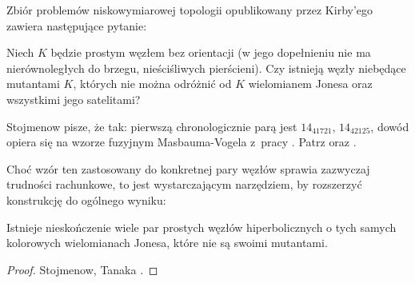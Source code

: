 Zbiór problemów niskowymiarowej topologii opublikowany przez Kirby'ego \cite{kirby1978} zawiera następujące pytanie:
%

\begin{conjecture}[problem 1.91]
    Niech $K$ będzie prostym węzłem bez orientacji (w jego dopełnieniu nie ma nierównoległych do brzegu, nieściśliwych pierścieni).
%
    Czy istnieją węzły niebędące mutantami $K$, których nie można odróżnić od $K$ wielomianem Jonesa oraz wszystkimi jego satelitami?
\end{conjecture}

Stojmenow pisze, że tak: pierwszą chronologicznie parą jest $14_{41721}$, $14_{42125}$, dowód opiera się na wzorze fuzyjnym Masbauma-Vogela z~pracy \cite{masbaum1994}.
%
%
%
Patrz \cite[przykład 3.3]{tanaka2009} oraz \cite[przykład 3.2]{stoimenow2010}.

Choć wzór ten zastosowany do konkretnej pary węzłów sprawia zazwyczaj trudności rachunkowe, to jest wystarczającym narzędziem, by rozszerzyć konstrukcję do ogólnego wyniku:

\begin{proposition}
    Istnieje nieskończenie wiele par prostych węzłów hiperbolicznych o tych samych kolorowych wielomianach Jonesa, które nie są swoimi mutantami.
\end{proposition}

\begin{proof}
    Stojmenow, Tanaka \cite[tw. 1.1]{tanaka2009}.
\end{proof}



